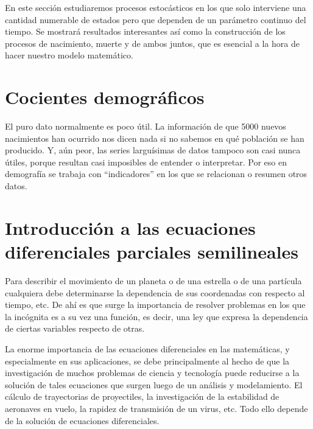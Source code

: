 \documentclass[a4paper,11pt]{book}
\begin{document}
    En este sección estudiaremos procesos estocásticos en los que solo interviene una cantidad numerable de estados pero que dependen de un parámetro continuo del tiempo. Se mostrará resultados interesantes así como la construcción de los procesos de nacimiento, muerte y de ambos juntos, que es esencial a la hora de hacer nuestro modelo matemático.
    
    
    
    
    
\chapter{Cocientes demográficos}
    El puro dato normalmente es poco útil. La información de que 5000 nuevos nacimientos han ocurrido nos dicen nada si no sabemos en qué población se han producido. Y, aún peor, las series larguísimas de datos tampoco son casi nunca útiles, porque resultan casi imposibles de entender o interpretar. Por eso en demografía se trabaja con “indicadores” en los que se relacionan o resumen otros datos.
    
    

\chapter{Introducción a las ecuaciones diferenciales parciales semilineales}

Para describir el movimiento de un planeta o de una estrella o de una partícula cualquiera debe determinarse la dependencia de sus coordenadas con respecto al tiempo, etc. De ahí es que surge la importancia de resolver problemas en los que la incógnita es a su vez una función, es decir, una ley que expresa la dependencia de ciertas variables respecto de otras.

La enorme importancia de las ecuaciones diferenciales en las matemáticas, y especialmente en sus aplicaciones, se debe principalmente al hecho de que la investigación de muchos problemas de ciencia y tecnología puede reducirse a la solución de tales ecuaciones que surgen luego de un análisis y modelamiento. El cálculo de trayectorias de proyectiles, la investigación de la estabilidad de aeronaves en vuelo, la rapidez de transmisión de un virus, etc. Todo ello depende de la solución de ecuaciones diferenciales.
\end{document}
